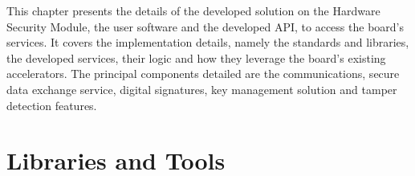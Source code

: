 \cleardoublepage
\label{chap:implementation}

This chapter presents the details of the developed solution on the Hardware Security Module, the user software and the developed API, to access the board's services.
It covers the implementation details, namely the standards and libraries, the developed services, their logic and how they leverage the board's existing accelerators. The principal components detailed are the communications, secure data exchange service, digital signatures, key management solution and tamper detection features.

\section{Libraries and Tools}\label{chap:implementation:tools}

